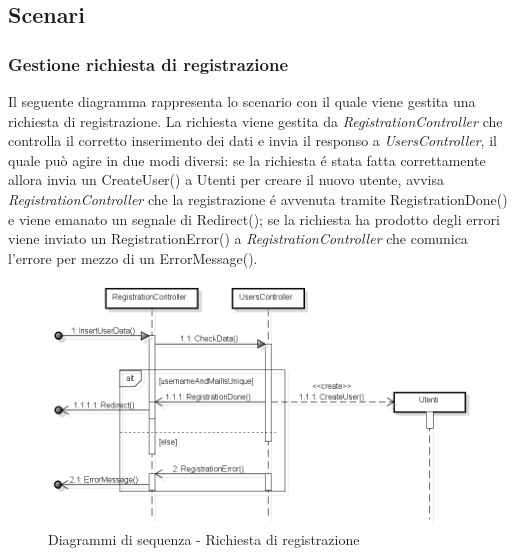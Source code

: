 \subsection{Scenari}
	\subsubsection{Gestione richiesta di registrazione}
	Il seguente diagramma rappresenta lo scenario con il quale viene gestita una richiesta di registrazione. La richiesta viene gestita da \textit{RegistrationController} che controlla il corretto inserimento dei dati e invia il responso a \textit{UsersController}, il quale può agire in due modi diversi: se la richiesta é stata fatta correttamente allora invia un CreateUser() a Utenti per creare il nuovo utente, avvisa \textit{RegistrationController} che la registrazione é avvenuta tramite RegistrationDone() e viene emanato un segnale di Redirect(); se la richiesta ha prodotto degli errori viene inviato un RegistrationError() a \textit{RegistrationController} che comunica l'errore per mezzo di un ErrorMessage().
	\begin{figure}[H]
		\centering
		\includegraphics[scale=0.5]{img/register.png}
		\caption{Diagrammi di sequenza - Richiesta di registrazione}
	\end{figure}

